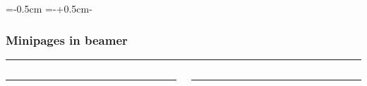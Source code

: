 \documentclass[aspectratio=169, xcolor={x11names}]{beamer}
\newlength{\widthTextMarginLeft}
\begin{document}
{
\makeatletter
\def\Gm@lmargin{0.5cm}%
\def\Gm@rmargin{0.5cm}%
\textwidth=\dimexpr\paperwidth-\Gm@lmargin-\Gm@rmargin\relax
\hsize\textwidth
\columnwidth\textwidth
\hoffset=\dimexpr-\beamer@leftsidebar+\Gm@lmargin-\widthTextMarginLeft\relax
\makeatother
\begin{frame}
\frametitle{Minipages in beamer}

\rule{\textwidth}{1pt}

\begin{columns}[T,onlytextwidth]

    \begin{column}{.48\textwidth}
    \rule{\textwidth}{1pt}
    \end{column}

    \begin{column}{.48\textwidth}
        \rule{\textwidth}{1pt}  
    \end{column}

\end{columns}

\end{frame}
}
\end{document}
